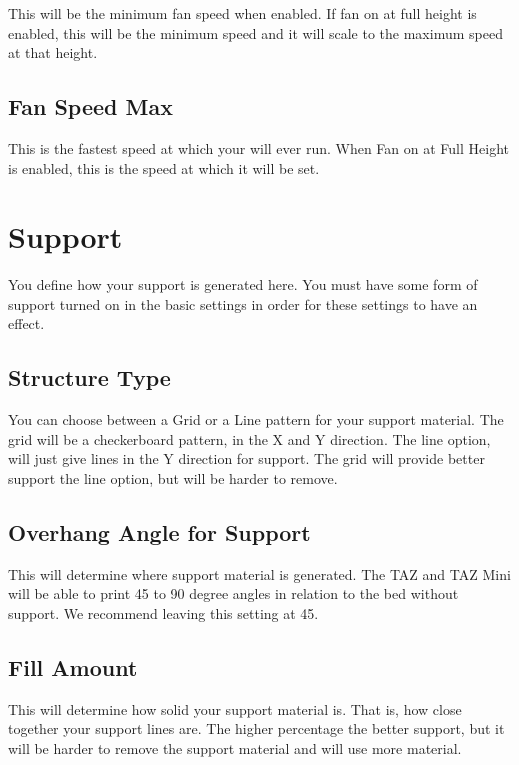 This will be the minimum fan speed when enabled. If fan on at full height is enabled, this will be the minimum speed and it will scale to the maximum speed at that height.

\subsection{Fan Speed Max}

This is the fastest speed at which your will ever run. When Fan on at Full Height is enabled, this is the speed at which it will be set.

\section{Support}

You define how your support is generated here. You must have some form of support turned on in the basic settings in order for these settings to have an effect.

\subsection{Structure Type}

You can choose between a Grid or a Line pattern for your support material. The grid will be a checkerboard pattern, in the X and Y direction. The line option, will just give lines in the Y direction for support. The grid will provide better support the line option, but will be harder to remove.

\subsection{Overhang Angle for Support}

This will determine where support material is generated. The TAZ and TAZ Mini will be able to print 45 to 90 degree angles in relation to the bed without support. We recommend leaving this setting at 45.

\subsection{Fill Amount}

This will determine how solid your support material is. That is, how close together your support lines are. The higher percentage the better support, but it will be harder to remove the support material and will use more material.

